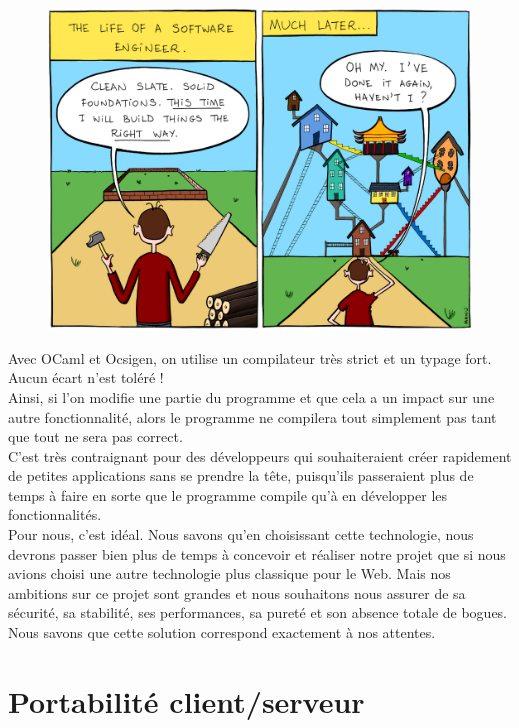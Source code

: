 \documentclass{life-fr}
\begin{document}
\begin{figure}[H]
  \begin{center}
    \includegraphics[width=13cm]{img/proj.png}
  \end{center}
\end{figure}

\newpage

Avec OCaml et Ocsigen, on utilise un compilateur très strict et un typage fort. Aucun écart n'est toléré !\\
Ainsi, si l'on modifie une partie du programme et que cela a un impact sur une autre fonctionnalité, alors le programme ne compilera tout simplement pas tant que tout ne sera pas correct.\\

C'est très contraignant pour des développeurs qui souhaiteraient créer rapidement de petites applications sans se prendre la tête, puisqu'ils passeraient plus de temps à faire en sorte que le programme compile qu'à en développer les fonctionnalités.\\
Pour nous, c'est idéal. Nous savons qu'en choisissant cette technologie, nous devrons passer bien plus de temps à concevoir et réaliser notre projet que si nous avions choisi une autre technologie plus classique pour le Web. Mais nos ambitions sur ce projet sont grandes et nous souhaitons nous assurer de sa sécurité, sa stabilité, ses performances, sa pureté et son absence totale de bogues. Nous savons que cette solution correspond exactement à nos attentes.
\\

\section{Portabilité client/serveur}
\end{document}

